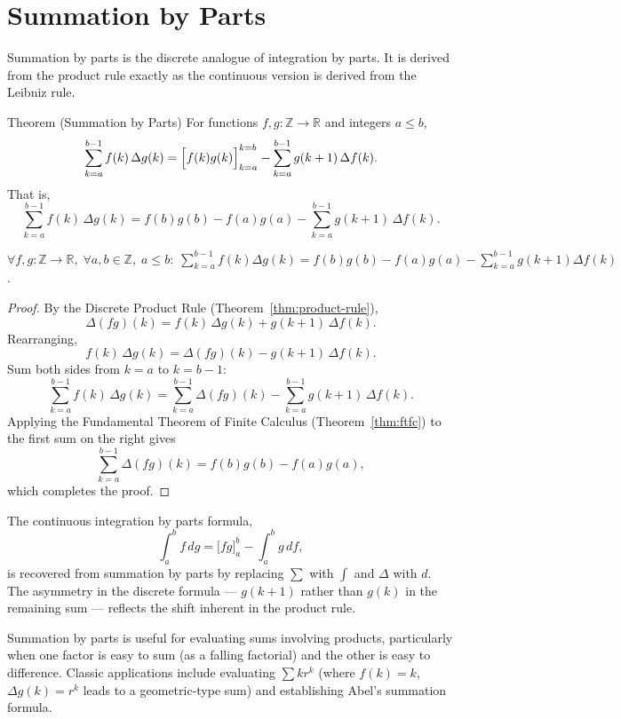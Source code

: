 
\section*{Summation by Parts}

Summation by parts is the discrete analogue of integration by parts.
It is derived from the product rule exactly as the continuous version
is derived from the Leibniz rule.

\begin{theorembox}{Theorem (Summation by Parts)}
For functions \(f, g : \mathbb{Z} \to \mathbb{R}\) and integers \(a \le b\),
\[
\sum_{k=a}^{b-1} f(k)\,\Delta g(k)
=
\Bigl[f(k)g(k)\Bigr]_{k=a}^{k=b}
-
\sum_{k=a}^{b-1} g(k+1)\,\Delta f(k).
\]
That is,
\[
\sum_{k=a}^{b-1} f(k)\,\Delta g(k)
=
f(b)g(b)-f(a)g(a)
-
\sum_{k=a}^{b-1} g(k+1)\,\Delta f(k).
\]
\end{theorembox}
\label{thm:summation-by-parts}

\begin{remark*}
\(\forall f,g : \mathbb{Z}\to\mathbb{R},\; \forall a,b\in\mathbb{Z},\; a\le b:\;
\displaystyle\sum_{k=a}^{b-1}f(k)\Delta g(k)
= f(b)g(b) - f(a)g(a) - \sum_{k=a}^{b-1}g(k+1)\Delta f(k)\).
\end{remark*}

\begin{proof}
By the Discrete Product Rule (Theorem~\ref{thm:product-rule}),
\[
\Delta(fg)(k) = f(k)\,\Delta g(k) + g(k+1)\,\Delta f(k).
\]
Rearranging,
\[
f(k)\,\Delta g(k) = \Delta(fg)(k) - g(k+1)\,\Delta f(k).
\]
Sum both sides from \(k = a\) to \(k = b-1\):
\[
\sum_{k=a}^{b-1} f(k)\,\Delta g(k)
=
\sum_{k=a}^{b-1} \Delta(fg)(k)
-
\sum_{k=a}^{b-1} g(k+1)\,\Delta f(k).
\]
Applying the Fundamental Theorem of Finite Calculus
(Theorem~\ref{thm:ftfc}) to the first sum on the right gives
\[
\sum_{k=a}^{b-1} \Delta(fg)(k) = f(b)g(b) - f(a)g(a),
\]
which completes the proof.
\end{proof}

\begin{remark*}
The continuous integration by parts formula,
\[
\int_a^b f\,dg = \bigl[fg\bigr]_a^b - \int_a^b g\,df,
\]
is recovered from summation by parts by replacing \(\sum\) with
\(\int\) and \(\Delta\) with \(d\). The asymmetry in the discrete
formula --- \(g(k+1)\) rather than \(g(k)\) in the remaining sum ---
reflects the shift inherent in the product rule.
\end{remark*}

\begin{remark*}[Applications]
Summation by parts is useful for evaluating sums involving products,
particularly when one factor is easy to sum (as a falling factorial)
and the other is easy to difference. Classic applications include
evaluating \(\sum k r^k\) (where \(f(k) = k\), \(\Delta g(k) = r^k\)
leads to a geometric-type sum) and establishing Abel's summation formula.
\end{remark*}
